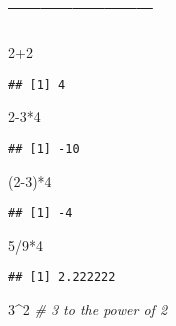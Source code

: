 \documentclass[
]{article}
\newenvironment{Shaded}{\begin{snugshade}}{\end{snugshade}}
\newcommand{\CommentTok}[1]{\textcolor[rgb]{0.56,0.35,0.01}{\textit{#1}}}
\newcommand{\DecValTok}[1]{\textcolor[rgb]{0.00,0.00,0.81}{#1}}
\newcommand{\NormalTok}[1]{#1}
\newcommand{\SpecialCharTok}[1]{\textcolor[rgb]{0.00,0.00,0.00}{#1}}
\begin{document}
\hypertarget{section-3}{%
\section{--------------}\label{section-3}}

\begin{Shaded}
\begin{Highlighting}[]
\DecValTok{2}\SpecialCharTok{+}\DecValTok{2}
\end{Highlighting}
\end{Shaded}

\begin{verbatim}
## [1] 4
\end{verbatim}

\begin{Shaded}
\begin{Highlighting}[]
\DecValTok{2{-}3}\SpecialCharTok{*}\DecValTok{4}
\end{Highlighting}
\end{Shaded}

\begin{verbatim}
## [1] -10
\end{verbatim}

\begin{Shaded}
\begin{Highlighting}[]
\NormalTok{(}\DecValTok{2{-}3}\NormalTok{)}\SpecialCharTok{*}\DecValTok{4}
\end{Highlighting}
\end{Shaded}

\begin{verbatim}
## [1] -4
\end{verbatim}

\begin{Shaded}
\begin{Highlighting}[]
\DecValTok{5}\SpecialCharTok{/}\DecValTok{9}\SpecialCharTok{*}\DecValTok{4}
\end{Highlighting}
\end{Shaded}

\begin{verbatim}
## [1] 2.222222
\end{verbatim}

\begin{Shaded}
\begin{Highlighting}[]
\DecValTok{3}\SpecialCharTok{\^{}}\DecValTok{2}   \CommentTok{\# 3 to the power of 2}
\end{Highlighting}
\end{Shaded}
\end{document}
